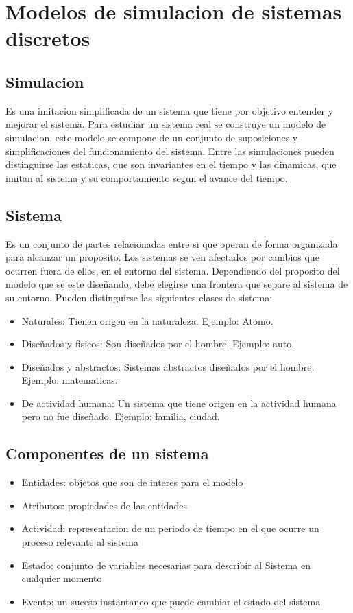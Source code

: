 \documentclass[a4paper]{article}
\begin{document}
\section{Modelos de simulacion de sistemas discretos}
\subsection{Simulacion}
Es una imitacion simplificada de un sistema que tiene por objetivo entender
y mejorar el sistema. 
Para estudiar un sistema real se construye un modelo de simulacion, este modelo 
se compone de un conjunto de suposiciones y simplificaciones del funcionamiento 
del sistema.
Entre las simulaciones pueden distinguirse
las estaticas, que son invariantes en el tiempo y las dinamicas, que imitan
al sistema y su comportamiento segun el avance del tiempo.

\subsection{Sistema} 
Es un conjunto de partes relacionadas entre si que operan de forma 
organizada para alcanzar un proposito.
Los sistemas se ven afectados por cambios que ocurren fuera de ellos,
en el entorno del sistema. Dependiendo del proposito del modelo que 
se este diseñando, debe elegirse una frontera que separe al sistema de
su entorno.
Pueden distinguirse las siguientes clases de sistema:
\begin{itemize}
    \item Naturales: Tienen origen en la naturaleza. Ejemplo: Atomo.
    \item Diseñados y fisicos: Son diseñados por el hombre. Ejemplo: auto.
    \item Diseñados y abstractos: Sistemas abstractos diseñados por el
        hombre. Ejemplo: matematicas.
    \item De actividad humana: Un sistema que tiene origen en la actividad
        humana pero no fue diseñado. Ejemplo: familia, ciudad.
\end{itemize}

\subsection*{Componentes de un sistema}
\begin{itemize}
    \item Entidades: objetos que son de interes para el modelo
    \item Atributos: propiedades de las entidades
    \item Actividad: representacion de un periodo de tiempo en el que ocurre un
    proceso relevante al sistema
    \item Estado: conjunto de variables necesarias para describir al Sistema
    en cualquier momento
    \item Evento: un suceso instantaneo que puede cambiar el estado del sistema
\end{itemize}
\end{document}
